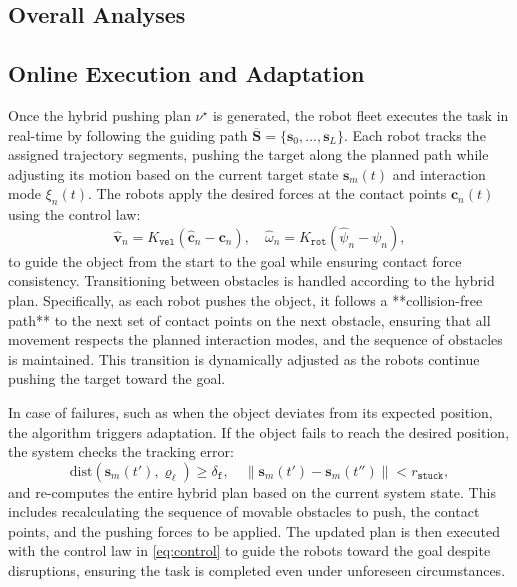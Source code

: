 \subsection{Overall Analyses}\label{subsec:overall}


\subsection{Online Execution and Adaptation}\label{subsec:execute}

Once the hybrid pushing plan $\nu^\star$ is generated, the robot fleet executes the task
in real-time by following the guiding path $\overline{\mathbf{S}} = \{\mathbf{s}_0, \dots,
\mathbf{s}_L\}$. Each robot tracks the assigned trajectory segments, pushing the target
along the planned path while adjusting its motion based on the current target state
$\mathbf{s}_m(t)$ and interaction mode $\xi_n(t)$. The robots apply the desired forces
at the contact points $\mathbf{c}_n(t)$ using the control law:
\[
  \widehat{\mathbf{v}}_n = K_{\texttt{vel}} \left(\widehat{\mathbf{c}}_n - \mathbf{c}_n\right), \quad
  \widehat{\omega}_n = K_{\texttt{rot}} \left(\widehat{\psi}_n - \psi_n\right),
\]
to guide the object from the start to the goal while ensuring contact force consistency.
Transitioning between obstacles is handled according to the hybrid plan. Specifically,
as each robot pushes the object, it follows a **collision-free path** to the next set of
contact points on the next obstacle, ensuring that all movement respects the planned
interaction modes, and the sequence of obstacles is maintained. This transition is dynamically
adjusted as the robots continue pushing the target toward the goal.

In case of failures, such as when the object deviates from its expected position,
the algorithm triggers adaptation. If the object fails to reach the desired position,
the system checks the tracking error:
\[
  \mathrm{dist}(\mathbf{s}_m(t'), \varrho_\ell) \geq \delta_{\texttt{f}}, \quad
  \|\mathbf{s}_m(t') - \mathbf{s}_m(t'')\| < r_{\texttt{stuck}},
\]
and re-computes the entire hybrid plan based on the current system state. This includes
recalculating the sequence of movable obstacles to push, the contact points, and the
pushing forces to be applied. The updated plan is then executed with the control law in
\eqref{eq:control} to guide the robots toward the goal despite disruptions, ensuring
the task is completed even under unforeseen circumstances.



